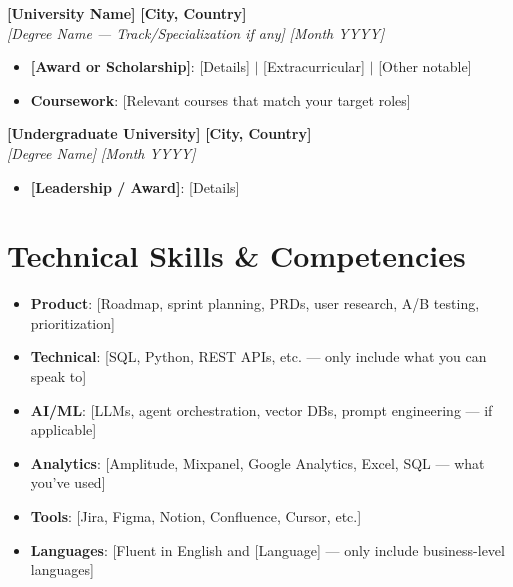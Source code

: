 \documentclass[11pt,letterpaper]{article}
\newcommand{\eduEntry}[4]{%
  \vspace{2pt}%
  \textbf{#1} \hfill \textbf{#2} \\[1pt]%
  \textit{#3} \hfill \textit{#4}%
  \vspace{0pt}%
}
\begin{document}
\eduEntry{[University Name]}{[City, Country]}{[Degree Name --- Track/Specialization if any]}{[Month YYYY]}
\begin{itemize}
  \item \textbf{[Award or Scholarship]}: [Details] $|$ [Extracurricular] $|$ [Other notable]
  \item \textbf{Coursework}: [Relevant courses that match your target roles]
\end{itemize}

\eduEntry{[Undergraduate University]}{[City, Country]}{[Degree Name]}{[Month YYYY]}
\begin{itemize}
  \item \textbf{[Leadership / Award]}: [Details]
\end{itemize}


\section{Technical Skills \& Competencies}
\begin{itemize}
  \item \textbf{Product}: [Roadmap, sprint planning, PRDs, user research, A/B testing, prioritization]
  \item \textbf{Technical}: [SQL, Python, REST APIs, etc. — only include what you can speak to]
  \item \textbf{AI/ML}: [LLMs, agent orchestration, vector DBs, prompt engineering — if applicable]
  \item \textbf{Analytics}: [Amplitude, Mixpanel, Google Analytics, Excel, SQL — what you've used]
  \item \textbf{Tools}: [Jira, Figma, Notion, Confluence, Cursor, etc.]
  \item \textbf{Languages}: [Fluent in English and [Language] — only include business-level languages]
\end{itemize}
\end{document}
